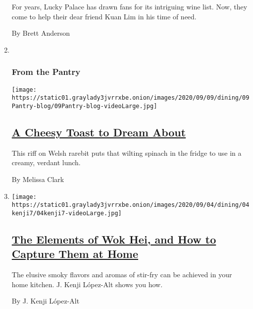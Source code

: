 \begin{enumerate}
  For years, Lucky Palace has drawn fans for its intriguing wine list.
  Now, they come to help their dear friend Kuan Lim in his time of need.

  By Brett Anderson
\item ~
  \hypertarget{from-the-pantry}{%
  \subsubsection{From the Pantry}\label{from-the-pantry}}

  \texttt{[image: https://static01.graylady3jvrrxbe.onion/images/2020/09/09/dining/09Pantry-blog/09Pantry-blog-videoLarge.jpg]}

  \hypertarget{a-cheesy-toast-to-dream-about}{%
  \subsection{\texorpdfstring{\href{/2020/09/09/dining/spinach-rarebit-recipe.html}{A
  Cheesy Toast to Dream
  About}}{A Cheesy Toast to Dream About}}\label{a-cheesy-toast-to-dream-about}}

  This riff on Welsh rarebit puts that wilting spinach in the fridge to
  use in a creamy, verdant lunch.

  By Melissa Clark
\item
  \texttt{[image: https://static01.graylady3jvrrxbe.onion/images/2020/09/04/dining/04kenji7/04kenji7-videoLarge.jpg]}

  \hypertarget{the-elements-of-wok-hei-and-how-to-capture-them-at-home}{%
  \subsection{\texorpdfstring{\href{/2020/09/04/dining/stir-fry-recipe-wok-hei.html}{The
  Elements of Wok Hei, and How to Capture Them at
  Home}}{The Elements of Wok Hei, and How to Capture Them at Home}}\label{the-elements-of-wok-hei-and-how-to-capture-them-at-home}}

  The elusive smoky flavors and aromas of stir-fry can be achieved in
  your home kitchen. J. Kenji López-Alt shows you how.

  By J. Kenji López-Alt
\end{enumerate}

